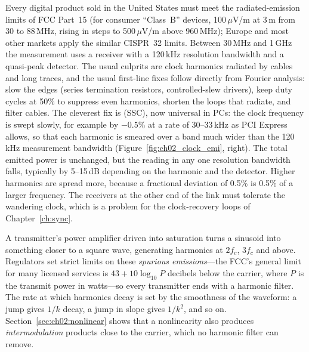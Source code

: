 \begin{inpractice}
Every digital product sold in the United States must meet the radiated-emission limits of FCC
Part~15 (for consumer ``Class~B'' devices, 100\,$\mu$V/m at 3\,m from 30 to 88\,MHz, rising in
steps to 500\,$\mu$V/m above 960\,MHz); Europe and most other markets apply the similar CISPR~32
limits. Between 30\,MHz and 1\,GHz the measurement uses a receiver with a 120\,kHz resolution
bandwidth and a quasi-peak detector. The usual culprits are clock harmonics radiated by cables
and long traces, and the usual first-line fixes follow directly from Fourier analysis: slow the
edges (series termination resistors, controlled-slew drivers), keep duty cycles at 50\% to
suppress even harmonics, shorten the loops that radiate, and filter cables. The cleverest fix
is  (SSC), now universal in PCs: the clock frequency is swept slowly,
for example by $-0.5$\% at a rate of 30--33\,kHz as PCI Express allows, so that each harmonic is
smeared over a band much wider than the 120\,kHz measurement bandwidth
(Figure~\ref{fig:ch02_clock_emi}, right). The total emitted power is unchanged, but the reading in
any one resolution bandwidth falls, typically by 5--15\,dB depending on the harmonic and the detector.
Higher harmonics are spread more, because a fractional deviation of 0.5\% is 0.5\% of a larger
frequency. The receivers at the other end of the link must tolerate the wandering clock, which is a
problem for the clock-recovery loops of Chapter~\ref{ch:sync}.
\end{inpractice}


\begin{inpractice}
A transmitter's power amplifier driven into saturation turns a sinusoid into something
closer to a square wave, generating harmonics at $2f_c$, $3f_c$ and above. Regulators set
strict limits on these \emph{spurious emissions}---the FCC's general limit for many
licensed services is $43+10\log_{10}P$ decibels below the carrier, where $P$ is the transmit
power in watts---so every transmitter ends with a harmonic filter. The rate at which harmonics
decay is set by the smoothness of the waveform: a jump gives $1/k$ decay, a jump in slope
gives $1/k^2$, and so on. Section~\ref{sec:ch02:nonlinear} shows that a nonlinearity also produces
\emph{intermodulation} products close to the carrier, which no harmonic filter can remove.
\end{inpractice}

